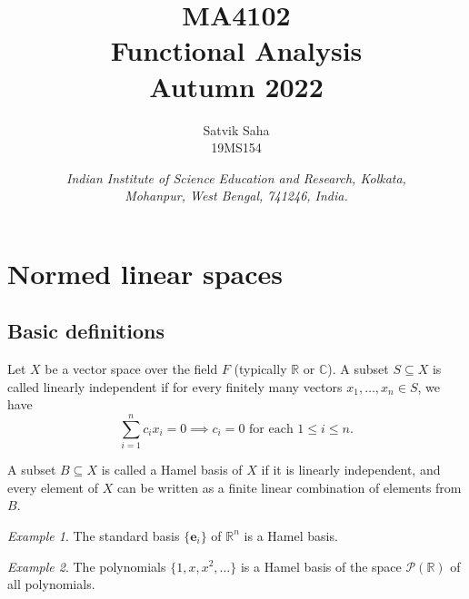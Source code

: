 \documentclass[11pt]{article}
\title{
    \Large\textsc{MA4102} \\
    \Huge \textbf{Functional Analysis} \\
    \vspace{5pt}
    \Large{Autumn 2022}
}
\author{
    \large Satvik Saha
    \\\textsc{\small 19MS154}
}
\date{\normalsize
    \textit{Indian Institute of Science Education and Research, Kolkata, \\
    Mohanpur, West Bengal, 741246, India.} \\
}
\newcommand{\C}{\mathbb{C}}
\newcommand{\R}{\mathbb{R}}
\theoremstyle{definition}
\theoremstyle{remark}
\newtheorem*{example}{Example}
\begin{document}
    \maketitle

    \tableofcontents
    \setlength{\parskip}{1em}


    \section{Normed linear spaces}

    \subsection{Basic definitions}

    \begin{definition}
        Let $X$ be a vector space over the field $F$ (typically $\R$ or $\C$). A
        subset $S \subseteq X$ is called linearly independent if for every finitely
        many vectors $x_1, \dots, x_n \in S$, we have \[
            \sum_{i = 1}^n c_ix_i = 0 \implies c_i = 0 \text{ for each } 1 \leq i \leq
            n.
        \]
    \end{definition}

    \begin{definition}
        A subset $B \subseteq X$ is called a Hamel basis of $X$ if it is linearly
        independent, and every element of $X$ can be written as a finite linear
        combination of elements from $B$.
    \end{definition}
    \begin{example}
        The standard basis $\{\bm{e}_i\}$ of $\R^n$ is a Hamel basis.
    \end{example}
    \begin{example}
        The polynomials $\{1, x, x^2, \dots\}$ is a Hamel basis of the space
        $\mathscr{P}(\R)$ of all polynomials.
    \end{example}
\end{document}
